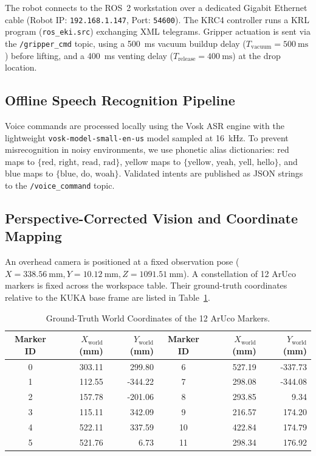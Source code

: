 \documentclass[runningheads]{llncs}
\begin{document}
The robot connects to the ROS~2 workstation over a dedicated Gigabit Ethernet cable (Robot IP: \texttt{192.168.1.147}, Port: \texttt{54600}). The KRC4 controller runs a KRL program (\texttt{ros\_eki.src}) exchanging XML telegrams. Gripper actuation is sent via the \texttt{/gripper\_cmd} topic, using a \SI{500}{\milli\second} vacuum buildup delay ($T_{\text{vacuum}} = \SI{500}{\milli\second}$) before lifting, and a \SI{400}{\milli\second} venting delay ($T_{\text{release}} = \SI{400}{\milli\second}$) at the drop location.

\subsection{Offline Speech Recognition Pipeline}
Voice commands are processed locally using the Vosk ASR engine with the lightweight \texttt{vosk-model-small-en-us} model sampled at \SI{16}{\kilo\hertz}. To prevent misrecognition in noisy environments, we use phonetic alias dictionaries: red maps to $\{\text{red, right, read, rad}\}$, yellow maps to $\{\text{yellow, yeah, yell, hello}\}$, and blue maps to $\{\text{blue, do, woah}\}$. Validated intents are published as JSON strings to the \texttt{/voice\_command} topic.

\subsection{Perspective-Corrected Vision and Coordinate Mapping}
An overhead camera is positioned at a fixed observation pose ($X = \SI{338.56}{\milli\meter}, Y = \SI{10.12}{\milli\meter}, Z = \SI{1091.51}{\milli\meter}$). A constellation of 12 ArUco markers is fixed across the workspace table. Their ground-truth coordinates relative to the KUKA base frame are listed in Table~\ref{tab:aruco_coords}.

\begin{table}[tb]
\caption{Ground-Truth World Coordinates of the 12 ArUco Markers.}
\label{tab:aruco_coords}
\centering
\begin{tabular}{crr|crr}
\toprule
\textbf{Marker ID} & \textbf{$X_{\text{world}}$ (mm)} & \textbf{$Y_{\text{world}}$ (mm)} & \textbf{Marker ID} & \textbf{$X_{\text{world}}$ (mm)} & \textbf{$Y_{\text{world}}$ (mm)} \\
\midrule
0  & 303.11 &  299.80 & 6  & 527.19 & -337.73 \\
1  & 112.55 & -344.22 & 7  & 298.08 & -344.08 \\
2  & 157.78 & -201.06 & 8  & 293.85 &    9.34 \\
3  & 115.11 &  342.09 & 9  & 216.57 &  174.20 \\
4  & 522.11 &  337.59 & 10 & 422.84 &  174.79 \\
5  & 521.76 &    6.73 & 11 & 298.34 &  176.92 \\
\bottomrule
\end{tabular}
\end{table}
\end{document}
